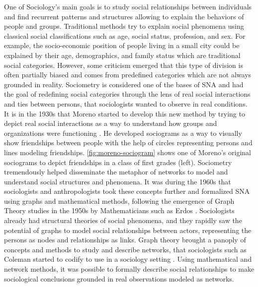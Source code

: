 One of Sociology's main goals is to study social relationships between individuals and find recurrent patterns and structures allowing to explain the behaviors of people and groups.
Traditional methods try to explain social phenomena using classical social classifications such as age, social status, profession, and sex.
For example, the socio-economic position of people living in a small city could be explained by their age, demographics, and family status which are traditional social categories.
However, some criticism emerged that this type of division is often partially biased and comes from predefined categories which are not always grounded in reality.
Sociometry is considered one of the bases of SNA and had the goal of redefining social categories through the lens of real social interactions and ties between persons, that sociologists wanted to observe in real conditions.
It is in the 1930s that Moreno started to develop this new method by trying to depict real social interactions as a way to understand how groups and organizations were functioning \cite{morenoFoundationsSociometryIntroduction1941}.
He developed sociograms as a way to visually show friendships between people with the help of circles representing persons and lines modeling friendships.
\autoref{fig:moreno-sociogram} shows one of Moreno's original sociograms to depict friendships in a class of first grades (left).
Sociometry tremendously helped disseminate the metaphor of networks to model and understand social structures and phenomena.
It was during the 1960s that sociologists and anthropologists took these concepts further and formalized SNA using graphs and mathematical methods, following the emergence of Graph Theory studies in the 1950s by Mathematicians such as Erdos \cite{erdos2011}.
Sociologists already had structural theories of social phenomena, and they rapidly saw the potential of graphs to model social relationships between actors, representing the persons as nodes and relationships as links.
Graph theory brought a panoply of concepts and methods to study and describe networks, that sociologists such as Coleman started to codify to use in a sociology setting \cite{colemanIntroductionMathematicalSociology1964}.
Using mathematical and network methods, it was possible to formally describe social relationships to make sociological conclusions grounded in real observations modeled as networks.


